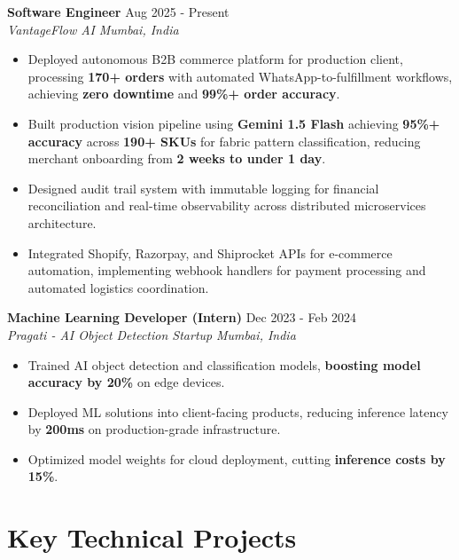 \documentclass[a4paper,10pt]{article}
\begin{document}
\textbf{Software Engineer} \hfill Aug 2025 - Present \\
\textit{VantageFlow AI} \hfill \textit{Mumbai, India}
\begin{itemize}[leftmargin=0.15in, label={$\bullet$}, itemsep=0pt, parsep=2pt]
    \item Deployed autonomous B2B commerce platform for production client, processing \textbf{170+ orders} with automated WhatsApp-to-fulfillment workflows, achieving \textbf{zero downtime} and \textbf{99\%+ order accuracy}.
    \item Built production vision pipeline using \textbf{Gemini 1.5 Flash} achieving \textbf{95\%+ accuracy} across \textbf{190+ SKUs} for fabric pattern classification, reducing merchant onboarding from \textbf{2 weeks to under 1 day}.
    \item Designed audit trail system with immutable logging for financial reconciliation and real-time observability across distributed microservices architecture.
    \item Integrated Shopify, Razorpay, and Shiprocket APIs for e-commerce automation, implementing webhook handlers for payment processing and automated logistics coordination.
\end{itemize}

\textbf{Machine Learning Developer (Intern)} \hfill Dec 2023 - Feb 2024 \\
\textit{Pragati - AI Object Detection Startup} \hfill \textit{Mumbai, India}
\begin{itemize}[leftmargin=0.15in, label={$\bullet$}, itemsep=0pt, parsep=2pt]
    \item Trained AI object detection and classification models, \textbf{boosting model accuracy by 20\%} on edge devices.
    \item Deployed ML solutions into client-facing products, reducing inference latency by \textbf{200ms} on production-grade infrastructure.
    \item Optimized model weights for cloud deployment, cutting \textbf{inference costs by 15\%}.
\end{itemize}

\section*{Key Technical Projects}
\end{document}
